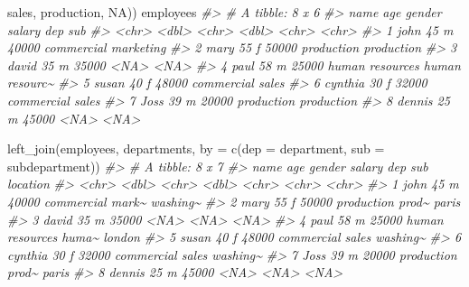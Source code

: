 \documentclass[
]{book}
\newenvironment{Shaded}{\begin{snugshade}}{\end{snugshade}}
\newcommand{\AttributeTok}[1]{\textcolor[rgb]{0.77,0.63,0.00}{#1}}
\newcommand{\CommentTok}[1]{\textcolor[rgb]{0.56,0.35,0.01}{\textit{#1}}}
\newcommand{\ConstantTok}[1]{\textcolor[rgb]{0.00,0.00,0.00}{#1}}
\newcommand{\FunctionTok}[1]{\textcolor[rgb]{0.00,0.00,0.00}{#1}}
\newcommand{\NormalTok}[1]{#1}
\newcommand{\OtherTok}[1]{\textcolor[rgb]{0.56,0.35,0.01}{#1}}
\newcommand{\StringTok}[1]{\textcolor[rgb]{0.31,0.60,0.02}{#1}}
\begin{document}
\begin{Shaded}
\begin{Highlighting}[]
            \StringTok{\textquotesingle{}sales\textquotesingle{}}\NormalTok{, }\StringTok{\textquotesingle{}production\textquotesingle{}}\NormalTok{, }\ConstantTok{NA}\NormalTok{))}
\NormalTok{employees}
\CommentTok{\#\textgreater{} \# A tibble: 8 x 6}
\CommentTok{\#\textgreater{}   name      age gender salary dep             sub           }
\CommentTok{\#\textgreater{}   \textless{}chr\textgreater{}   \textless{}dbl\textgreater{} \textless{}chr\textgreater{}   \textless{}dbl\textgreater{} \textless{}chr\textgreater{}           \textless{}chr\textgreater{}         }
\CommentTok{\#\textgreater{} 1 john       45 m       40000 commercial      marketing     }
\CommentTok{\#\textgreater{} 2 mary       55 f       50000 production      production    }
\CommentTok{\#\textgreater{} 3 david      35 m       35000 \textless{}NA\textgreater{}            \textless{}NA\textgreater{}          }
\CommentTok{\#\textgreater{} 4 paul       58 m       25000 human resources human resourc\textasciitilde{}}
\CommentTok{\#\textgreater{} 5 susan      40 f       48000 commercial      sales         }
\CommentTok{\#\textgreater{} 6 cynthia    30 f       32000 commercial      sales         }
\CommentTok{\#\textgreater{} 7 Joss       39 m       20000 production      production    }
\CommentTok{\#\textgreater{} 8 dennis     25 m       45000 \textless{}NA\textgreater{}            \textless{}NA\textgreater{}}

\FunctionTok{left\_join}\NormalTok{(employees, departments, }\AttributeTok{by =} \FunctionTok{c}\NormalTok{(}\StringTok{\textquotesingle{}dep\textquotesingle{}} \OtherTok{=} \StringTok{\textquotesingle{}department\textquotesingle{}}\NormalTok{, }\StringTok{\textquotesingle{}sub\textquotesingle{}} \OtherTok{=} \StringTok{\textquotesingle{}subdepartment\textquotesingle{}}\NormalTok{))}
\CommentTok{\#\textgreater{} \# A tibble: 8 x 7}
\CommentTok{\#\textgreater{}   name      age gender salary dep             sub   location}
\CommentTok{\#\textgreater{}   \textless{}chr\textgreater{}   \textless{}dbl\textgreater{} \textless{}chr\textgreater{}   \textless{}dbl\textgreater{} \textless{}chr\textgreater{}           \textless{}chr\textgreater{} \textless{}chr\textgreater{}   }
\CommentTok{\#\textgreater{} 1 john       45 m       40000 commercial      mark\textasciitilde{} washing\textasciitilde{}}
\CommentTok{\#\textgreater{} 2 mary       55 f       50000 production      prod\textasciitilde{} paris   }
\CommentTok{\#\textgreater{} 3 david      35 m       35000 \textless{}NA\textgreater{}            \textless{}NA\textgreater{}  \textless{}NA\textgreater{}    }
\CommentTok{\#\textgreater{} 4 paul       58 m       25000 human resources huma\textasciitilde{} london  }
\CommentTok{\#\textgreater{} 5 susan      40 f       48000 commercial      sales washing\textasciitilde{}}
\CommentTok{\#\textgreater{} 6 cynthia    30 f       32000 commercial      sales washing\textasciitilde{}}
\CommentTok{\#\textgreater{} 7 Joss       39 m       20000 production      prod\textasciitilde{} paris   }
\CommentTok{\#\textgreater{} 8 dennis     25 m       45000 \textless{}NA\textgreater{}            \textless{}NA\textgreater{}  \textless{}NA\textgreater{}}
\end{Highlighting}
\end{Shaded}
\end{document}
